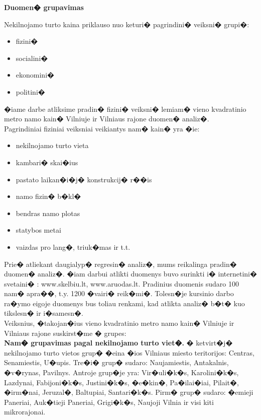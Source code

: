 \documentclass[a4paper]{article}
\begin{document}
\centerline{\textbf{\large Duomen� grupavimas}}
\bigskip
\hspace{1cm}Nekilnojamo turto kaina priklauso nuo keturi� pagrindini� veiksni� grupi�:
\begin{itemize}
\item  fizini�
\item socialini�
\item ekonomini�
\item politini�
\end{itemize}
\hspace*{1cm} �iame darbe atliksime pradin� fizini� veiksni� lemiam� vieno kvadratinio metro namo kain� Vilniuje ir Vilniaus rajone duomen� analiz�.\\
\hspace*{1cm}Pagrindiniai fiziniai veiksniai veikiantys nam� kain� yra �ie:
\begin{itemize}
\item  nekilnojamo turto vieta
\item kambari� skai�ius
\item pastato laikan�i�j� konstrukcij� r��is
\item namo fizin� b�kl�
\item bendras namo plotas
\item statybos metai
\item vaizdas pro lang�, triuk�mas ir t.t.
\end{itemize}
\hspace*{1cm}Prie� atliekant daugialyp� regresin� analiz�, mums reikalinga pradin� duomen� analiz�. �iam darbui atlikti duomenys buvo surinkti i� internetini� svetaini� : www.skelbiu.lt, www.aruodas.lt. Pradinius duomenis sudaro 100 nam� apra��, t.y. 1200 �vairi� reik�mi�. Tolesn�je kursinio darbo ra�ymo eigoje duomenys bus toliau renkami, kad atlikta analiz� b�t� kuo tikslesn� ir i�samesn�.\\
\hspace*{1cm} Veiksnius, �takojan�ius vieno kvadratinio metro namo kain� Vilniuje ir Vilniaus rajone suskirst�me � grupes:\\
\smallskip
\hspace*{1cm}\textbf{Nam� grupavimas pagal nekilnojamo turto viet�.}
� ketvirt�j� nekilnojamo turto vietos grup� �eina �ios Vilniaus miesto teritorijos: Centras, Senamiestis, U�upis. Tre�i� grup� sudaro: Naujamiestis, Antakalnis, �v�rynas, Pavilnys. Antroje grup�je yra: Vir�uli�k�s, Karolini�k�s, Lazdynai, Fabijoni�k�s, Justini�k�s, �e�kin�, Pa�ilai�iai, Pilait�, �irm�nai, Jeruzal�, Baltupiai, Santari�k�s. Pirm� grup� sudaro: �emieji Paneriai, Auk�tieji Paneriai, Grigi�k�s, Naujoji Vilnia ir visi kiti mikrorajonai.\\
\end{document}
